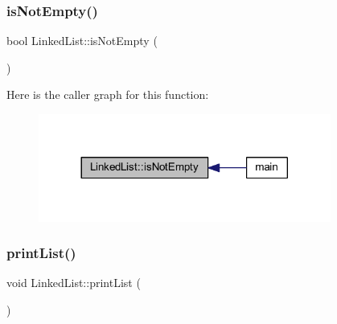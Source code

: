 \subsubsection{\texorpdfstring{is\+Not\+Empty()}{isNotEmpty()}}
{\footnotesize\ttfamily bool Linked\+List\+::is\+Not\+Empty (\begin{DoxyParamCaption}{ }\end{DoxyParamCaption})}

Here is the caller graph for this function\+:
\nopagebreak
\begin{figure}[H]
\begin{center}
\leavevmode
\includegraphics[width=272pt]{class_linked_list_a1a5c8f3b415fa55f7e876cf4a01f3380_icgraph}
\end{center}
\end{figure}
\mbox{\label{class_linked_list_ac96230938fd74a4efeb4efe8c995ee53}} 
\subsubsection{\texorpdfstring{print\+List()}{printList()}}
{\footnotesize\ttfamily void Linked\+List\+::print\+List (\begin{DoxyParamCaption}{ }\end{DoxyParamCaption})}


